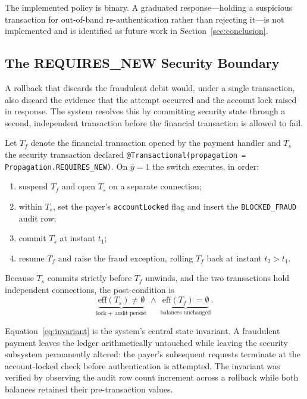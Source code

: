 \documentclass[conference]{IEEEtran}
\begin{document}
The implemented policy is binary. A graduated response---holding a
suspicious transaction for out-of-band re-authentication rather than
rejecting it---is not implemented and is identified as future work in
Section~\ref{sec:conclusion}.

\subsection{The REQUIRES\_NEW Security Boundary}
\label{subsec:requiresnew}

A rollback that discards the fraudulent debit would, under a single
transaction, also discard the evidence that the attempt occurred and
the account lock raised in response. The system resolves this by
committing security state through a second, independent transaction
before the financial transaction is allowed to fail.

Let $T_{f}$ denote the financial transaction opened by the payment
handler and $T_{s}$ the security transaction declared
\texttt{@Transactional(propagation = Propagation.REQUIRES\_NEW)}. On
$\hat{y}=1$ the switch executes, in order:
\begin{enumerate}
\item suspend $T_{f}$ and open $T_{s}$ on a separate connection;
\item within $T_{s}$, set the payer's \texttt{accountLocked} flag and
      insert the \texttt{BLOCKED\_FRAUD} audit row;
\item commit $T_{s}$ at instant $t_{1}$;
\item resume $T_{f}$ and raise the fraud exception, rolling $T_{f}$
      back at instant $t_{2} > t_{1}$.
\end{enumerate}

Because $T_{s}$ commits strictly before $T_{f}$ unwinds, and the two
transactions hold independent connections, the post-condition is
\begin{equation}
\underbrace{\mathrm{eff}(T_{s}) \neq \emptyset}_{\text{lock + audit persist}}
\;\wedge\;
\underbrace{\mathrm{eff}(T_{f}) = \emptyset}_{\text{balances unchanged}} .
\label{eq:invariant}
\end{equation}

Equation~\eqref{eq:invariant} is the system's central state invariant.
A fraudulent payment leaves the ledger arithmetically untouched while
leaving the security subsystem permanently altered: the payer's
subsequent requests terminate at the account-locked check before
authentication is attempted. The invariant was verified by observing
the audit row count increment across a rollback while both balances
retained their pre-transaction values.
\end{document}
